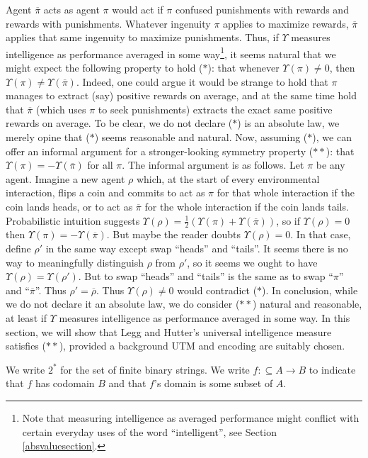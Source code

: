 \documentclass[runningheads]{llncs}
\begin{document}
Agent $\overline\pi$ acts as agent $\pi$ would act if $\pi$
confused punishments with rewards and rewards with punishments.
Whatever ingenuity $\pi$ applies to maximize rewards, $\overline\pi$ applies that same
ingenuity to maximize punishments. Thus, if $\Upsilon$ measures intelligence as
performance averaged in some way\footnote{Note that measuring intelligence as
averaged performance
might conflict with certain everyday uses of the word ``intelligent'',
see Section \ref{absvaluesection}.}, it seems natural that we might expect the
following property to hold ($*$): that whenever $\Upsilon(\pi)\not=0$,
then $\Upsilon(\pi)\not=\Upsilon(\overline\pi)$. Indeed, one could argue it
would be strange to hold that $\pi$ manages to extract (say) positive rewards on
average, and at the same time hold that $\overline\pi$ (which uses $\pi$ to seek
punishments) extracts the exact same positive rewards on average. To be clear, we
do not declare ($*$) is an absolute law, we merely opine that ($*$) seems
reasonable and natural. Now, assuming ($*$), we can offer an informal argument
for a stronger-looking symmetry property ($**$): that
$\Upsilon(\pi)=-\Upsilon(\overline\pi)$ for all $\pi$. The informal argument is
as follows. Let $\pi$ be any agent. Imagine a new agent $\rho$ which, at
the start of every environmental interaction, flips a coin and commits to act as
$\pi$ for that whole interaction if the coin lands heads, or to act as
$\overline\pi$ for the whole interaction if the coin lands tails.
Probabilistic intuition suggests
$\Upsilon(\rho)=\frac12(\Upsilon(\pi)+\Upsilon(\overline \pi))$, so if
$\Upsilon(\rho)=0$ then $\Upsilon(\pi)=-\Upsilon(\overline\pi)$.
But maybe the reader doubts $\Upsilon(\rho)=0$. In that case, define
$\rho'$ in the same way except swap ``heads'' and ``tails''. It seems
there is no way to meaningfully distinguish $\rho$ from $\rho'$, so it
seems we ought to have $\Upsilon(\rho)=\Upsilon(\rho')$. But to swap ``heads''
and ``tails'' is the same as to swap ``$\pi$'' and ``$\overline \pi$''.
Thus $\rho'=\overline\rho$. Thus $\Upsilon(\rho)\not=0$ would contradict ($*$).
In conclusion, while we do not declare it an absolute law, we do consider
($**$) natural and reasonable, at least if $\Upsilon$
measures intelligence as performance averaged in some way.
In this section, we will show that Legg and Hutter's universal intelligence measure
satisfies ($**$), provided a background UTM and encoding are suitably chosen.

We write $2^*$ for the set of finite binary strings.
We write $f:\subseteq A\to B$ to indicate that $f$ has codomain $B$
and that $f$'s domain is some subset of $A$.
\end{document}
